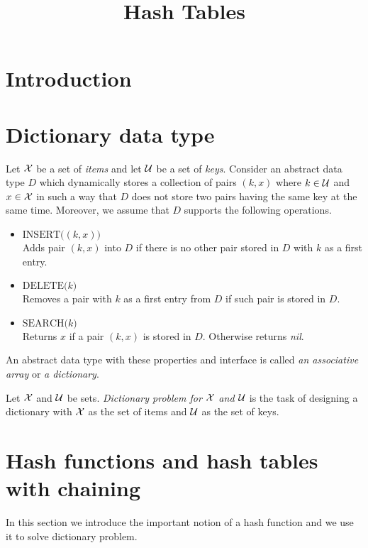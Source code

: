 


\title{Hash Tables}
\date{}
\maketitle

\section{Introduction}

\section{Dictionary data type}

\begin{definition}
Let ${\mathcal X}$ be a set of \textit{items} and let ${\mathcal U}$ be a set of \textit{keys}. Consider an abstract data type $D$ which dynamically stores a collection of pairs $(k, x)$ where $k\in {\mathcal U}$ and $x\in {\mathcal X}$ in such a way that $D$ does not store two pairs having the same key at the same time. Moreover, we assume that $D$ supports the following operations.
\begin{itemize}
\item[] $\textrm{INSERT}\big((k,x)\big)$\\
Adds pair $(k,x)$ into $D$ if there is no other pair stored in $D$ with $k$ as a first entry.
\item[] $\textrm{DELETE}\big(k\big)$\\
Removes a pair with $k$ as a first entry from $D$ if such pair is stored in $D$.
\item[] $\textrm{SEARCH}\big(k\big)$\\
Returns $x$ if a pair $(k,x)$ is stored in $D$. Otherwise returns \textit{nil}. 
\end{itemize}
An abstract data type with these properties and interface is called \textit{an associative array} or \textit{a dictionary}.
\end{definition}

\begin{definition}
Let ${\mathcal X}$ and ${\mathcal U}$ be sets. \textit{Dictionary problem for ${\mathcal X}$ and ${\mathcal U}$} is the task of designing a dictionary with ${\mathcal X}$ as the set of items and ${\mathcal U}$ as the set of keys.
\end{definition}

\section{Hash functions and hash tables with chaining}
\noindent
In this section we introduce the important notion of a hash function and we use it to solve dictionary problem.

